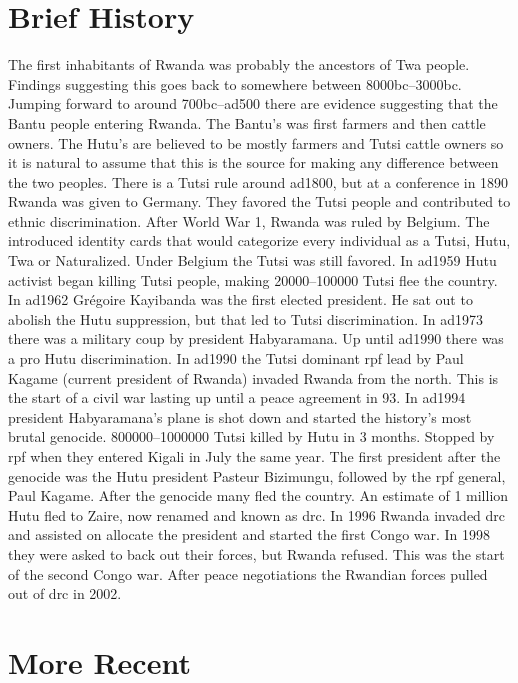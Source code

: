 \section{Brief History}
The first inhabitants of Rwanda was probably the ancestors of Twa people. Findings suggesting this goes back to somewhere between 8000\gls{bc}--3000\gls{bc}. Jumping forward to around 700\gls{bc}--\gls{ad}500 there are evidence suggesting that the Bantu people entering Rwanda. The Bantu's was first farmers and then cattle owners. The Hutu's are believed to be mostly farmers and Tutsi cattle owners so it is natural to assume that this is the source for making any difference between the two peoples. There is a Tutsi rule around \gls{ad}1800, but at a conference in 1890 Rwanda was given to Germany. They favored the Tutsi people and contributed to ethnic discrimination. After World War 1, Rwanda was ruled by Belgium. The introduced identity cards that would categorize every individual as a Tutsi, Hutu, Twa or Naturalized. Under Belgium the Tutsi was still favored. In \gls{ad}1959 Hutu activist began killing Tutsi people, making 20000--100000 Tutsi flee the country. In \gls{ad}1962 Grégoire Kayibanda was the first elected president. He sat out to abolish the Hutu suppression, but that led to Tutsi discrimination. In \gls{ad}1973 there was a military coup by president Habyaramana. Up until \gls{ad}1990 there was a pro Hutu discrimination. 
In \gls{ad}1990 the Tutsi dominant \gls{rpf} lead by Paul Kagame (current president of Rwanda) invaded Rwanda from the north. 
This is the start of a civil war lasting up until a peace agreement in 93. In \gls{ad}1994 president Habyaramana's plane is shot down and started the history's most brutal genocide. 800000--1000000 Tutsi killed by Hutu in 3 months. Stopped by \gls{rpf} when they entered Kigali in July the same year. The first president after the genocide was the Hutu president Pasteur Bizimungu, followed by the \gls{rpf} general, Paul Kagame. After the genocide many fled the country. An estimate of 1 million Hutu fled to Zaire, now renamed and known as \gls{drc}. In 1996 Rwanda invaded \gls{drc} and assisted on allocate the president and started the first Congo war. In 1998 they were asked to back out their forces, but Rwanda refused. This was the start of the second Congo war. After peace negotiations the Rwandian forces pulled out of \gls{drc} in 2002.

\section{More Recent}


